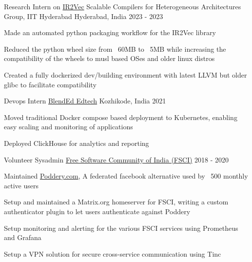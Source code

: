 \begin{cventries}
  \cventry
    {Research Intern on \href{https://github.com/IITH-Compilers/IR2Vec}{IR2Vec}} %
    {Scalable Compilers for Heterogeneous Architectures Group, IIT Hyderabad} %
    {Hyderabad, India} %
    {2023 - 2023} %
    {
      \begin{cvitems} %
        \item {Made an automated python packaging workflow for the IR2Vec library}
        \item {Reduced the python wheel size from ~60MB to ~5MB while increasing the compatibility of the wheels to musl based OSes and older linux distros}
        \item {Created a fully dockerized dev/building environment with latest LLVM but older glibc to facilitate compatibility}
      \end{cvitems}
    }

  \cventry
    {Devops Intern} %
    {\href{https://blend-ed.org/}{BlendEd Edtech}} %
    {Kozhikode, India} %
    {2021} %
    {
      \begin{cvitems} %
        \item {Moved traditional Docker compose based deployment to Kubernetes, enabling easy scaling and monitoring of applications}
        \item {Deployed ClickHouse for analytics and reporting}
      \end{cvitems}
    }

    \cventry
    {Volunteer Sysadmin} %
    {\href{https://fsci.in}{Free Software Community of India (FSCI)}} %
    {} %
    {2018 - 2020} %
    {
      \begin{cvitems} %
        \item {Maintained \href{https://poddery.com}{Poddery.com}, A federated facebook alternative used by ~500 monthly active users}
        \item {Setup and maintained a Matrix.org homeserver for FSCI, writing a custom authenticator plugin to let users authenticate against Poddery}
        \item {Setup monitoring and alerting for the various FSCI services using Prometheus and Grafana}
        \item {Setup a VPN solution for secure cross-service communication using Tinc}
      \end{cvitems}
    }
\end{cventries}
